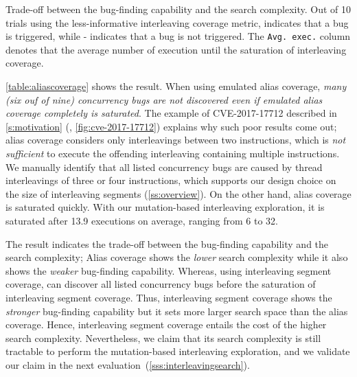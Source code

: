 %
\begin{table}[t]
  \small
  \centering
  
  \caption{Trade-off between the bug-finding capability and the search
    complexity. Out of 10 trials using the less-informative
    interleaving coverage metric, \checkmark\xspace indicates that a
    bug is triggered, while - indicates that a bug is not
    triggered. The \texttt{Avg. exec.}  column denotes that the
    average number of execution until the saturation of interleaving
    coverage.}
  \label{table:aliascoverage}
  \vspace{-5pt}
\end{table}
%
\autoref{table:aliascoverage} shows the result.
%
When using emulated alias coverage, \textit{many (six ouf of nine)
concurrency bugs are not discovered even if emulated alias coverage
completely is saturated}.
%
The example of CVE-2017-17712 described in \autoref{s:motivation}
(\ie, \autoref{fig:cve-2017-17712}) explains why such poor results come 
out; alias coverage considers only interleavings between two
instructions, which is \textit{not sufficient} to execute the
offending interleaving containing multiple instructions. We manually 
identify that all
listed concurrency bugs are caused by thread interleavings of three or
four instructions, which supports our design choice on the size of
interleaving segments (\autoref{ss:overview}).
%
On the other hand, alias coverage is saturated quickly. With
our mutation-based interleaving exploration, it is saturated after 13.9
executions on average, ranging from 6 to 32.
%

The result indicates the trade-off between the bug-finding
capability and the search complexity; Alias coverage shows the
\textit{lower} search complexity while it also shows the \textit{weaker}
bug-finding capability.
%
Whereas, using interleaving segment coverage, \sys can discover all listed
concurrency bugs before the saturation of interleaving
segment coverage. Thus, interleaving segment coverage shows the
\textit{stronger} bug-finding capability but it sets more larger search 
space than the alias coverage.
Hence, interleaving segment coverage entails the cost of the
higher search complexity. Nevertheless, we claim that 
its search complexity is still tractable to perform the mutation-based 
interleaving exploration, and we validate our claim  in the next
evaluation~(\autoref{sss:interleavingsearch}).







